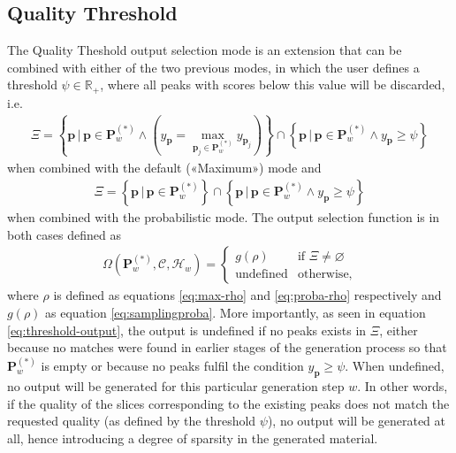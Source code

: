 \subsection{Quality Threshold}\label{ssec:qual-thresh}
The Quality Theshold output selection mode is an extension that can be combined with either of the two previous modes, in which the user defines a threshold $\psi \in \mathbb R_+$, where all peaks with scores below this value will be discarded, i.e.
	\begin{align}
		\Xi = \left\lbrace \bm p \,\bigg\vert	\, \bm p \in \bm P^{(\ast)}_w \wedge \left( y_{\bm p} = \max_{\bm p_j \in \bm P^{(\ast)}_w} y_{\bm p_j}\right)\right\rbrace
		\cap \left\lbrace \bm p \, \bigg\vert \, \bm p \in \bm P^{(\ast)}_w \wedge y_{\bm p} \ge \psi\right\rbrace
	\end{align}
	when combined with the default («Maximum») mode and 
	\begin{align}
		\Xi = \left\lbrace \bm p \, \bigg\vert \, \bm p \in \bm P^{(\ast)}_w\right\rbrace 
		\cap \left\lbrace \bm p \, \bigg\vert \, \bm p \in \bm P^{(\ast)}_w \wedge y_{\bm p} \ge \psi\right\rbrace
	\end{align}
	when combined with the probabilistic mode. The output selection function is in both cases defined as
	\begin{align}\label{eq:threshold-output}
		\Omega\left(\bm P^{(\ast)}_w, \mathcal C, \mathcal H_w\right) = \left\lbrace\begin{array}{ll}
				g(\rho) & \text{if } \Xi \ne \varnothing\\
				\text{undefined} & \text{otherwise},
			\end{array}\right.
	\end{align}
	where $\rho$ is defined as equations \ref{eq:max-rho} and \ref{eq:proba-rho} respectively and $g(\rho)$ as equation \ref{eq:samplingproba}. More importantly, as seen in equation \ref{eq:threshold-output}, the output is undefined if no peaks exists in $\Xi$, either because no matches were found in earlier stages of the generation process so that $\bm P^{(\ast)}_w$ is empty or because no peaks fulfil the condition $y_{\bm p} \ge \psi$. When undefined, no output will be generated for this particular generation step $w$. In other words, if the quality of the slices corresponding to the existing peaks does not match the requested quality (as defined by the threshold $\psi$), no output will be generated at all, hence introducing a degree of sparsity in the generated material.





